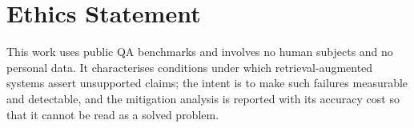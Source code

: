 \documentclass[11pt]{article}
\begin{document}
\section*{Ethics Statement}
This work uses public QA benchmarks and involves no human subjects and no personal
data. It characterises conditions under which retrieval-augmented systems assert
unsupported claims; the intent is to make such failures measurable and detectable,
and the mitigation analysis is reported with its accuracy cost so that it cannot be
read as a solved problem.


\end{document}

